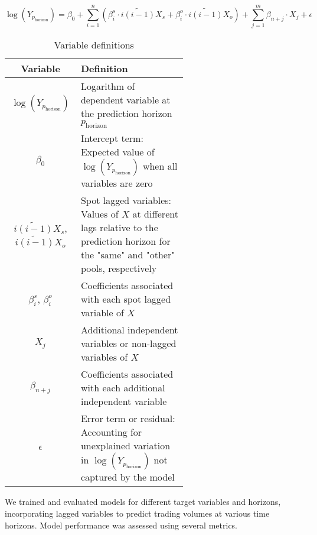 \documentclass{article}
\begin{document}
\begin{equation}
  \log(Y_{p_{\text{horizon}}}) = \beta_0 + \sum_{i=1}^{n} \left(\beta_i^s \cdot \widetilde{i(i-1)}X_s + \beta_i^o \cdot \widetilde{i(i-1)}X_o\right) + \sum_{j=1}^{m} \beta_{n+j} \cdot X_j + \epsilon
  \end{equation}
  
  \begin{table}[h!]
    \centering
    \small
    \begin{tabular}{|c|p{0.6\linewidth}|}
    \hline
    \textbf{Variable} & \textbf{Definition} \\
    \hline
    \(\log(Y_{p_{\text{horizon}}})\) & Logarithm of dependent variable at the prediction horizon \(p_{\text{horizon}}\) \\
    \(\beta_0\) & Intercept term: Expected value of \(\log(Y_{p_{\text{horizon}}})\) when all variables are zero \\
    \(\widetilde{i(i-1)}X_s\), \(\widetilde{i(i-1)}X_o\) & Spot lagged variables: Values of \(X\) at different lags relative to the prediction horizon for the "same" and "other" pools, respectively \\
    \(\beta_i^s\), \(\beta_i^o\) & Coefficients associated with each spot lagged variable of \(X\) \\
    \(X_j\) & Additional independent variables or non-lagged variables of \(X\) \\
    \(\beta_{n+j}\) & Coefficients associated with each additional independent variable \\
    \(\epsilon\) & Error term or residual: Accounting for unexplained variation in \(\log(Y_{p_{\text{horizon}}})\) not captured by the model \\
    \hline
    \end{tabular}
    \caption{Variable definitions}
    \label{tab:variables}
  \end{table}

We trained and evaluated models for different target variables and horizons, incorporating lagged variables to predict trading volumes at various time horizons. Model performance was assessed using several metrics.
\end{document}
